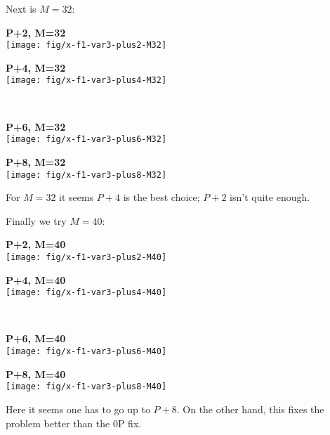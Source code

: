 \documentclass[a4paper,10pt]{article}
\begin{document}
Next is $M=32$:\\[\baselineskip]
\begin{minipage}{0.5\textwidth}\centering
  \textbf{P+2, M=32}\\
  \texttt{[image: fig/x-f1-var3-plus2-M32]}
\end{minipage}%
\begin{minipage}{0.5\textwidth}\centering
  \textbf{P+4, M=32}\\
  \texttt{[image: fig/x-f1-var3-plus4-M32]}
\end{minipage}\\
\begin{minipage}{0.5\textwidth}\centering
  \textbf{P+6, M=32}\\
  \texttt{[image: fig/x-f1-var3-plus6-M32]}
\end{minipage}%
\begin{minipage}{0.5\textwidth}\centering
  \textbf{P+8, M=32}\\
  \texttt{[image: fig/x-f1-var3-plus8-M32]}
\end{minipage}
For $M=32$ it seems $P+4$ is the best choice; $P+2$ isn't quite
enough.

Finally we try $M=40$:\\[\baselineskip]
\begin{minipage}{0.5\textwidth}\centering
  \textbf{P+2, M=40}\\
  \texttt{[image: fig/x-f1-var3-plus2-M40]}
\end{minipage}%
\begin{minipage}{0.5\textwidth}\centering
  \textbf{P+4, M=40}\\
  \texttt{[image: fig/x-f1-var3-plus4-M40]}
\end{minipage}\\
\begin{minipage}{0.5\textwidth}\centering
  \textbf{P+6, M=40}\\
  \texttt{[image: fig/x-f1-var3-plus6-M40]}
\end{minipage}%
\begin{minipage}{0.5\textwidth}\centering
  \textbf{P+8, M=40}\\
  \texttt{[image: fig/x-f1-var3-plus8-M40]}
\end{minipage}
Here it seems one has to go up to $P+8$. On the other hand, this
fixes the problem better than the 0P fix.
\end{document}
